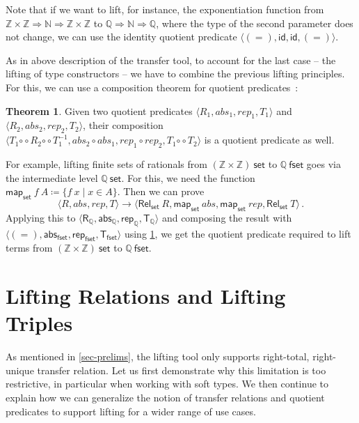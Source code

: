 \documentclass{article}
\theoremstyle{definition}
\newtheorem{theorem}[definition]{Theorem}
\newcommand{\relcomp}{\mathbin{\circ\circ}}
\newcommand{\inv}{^{-1}}
\newcommand{\bool}{\mathsf{Bool}}
\newcommand{\id}{\mathsf{id}}
\newcommand{\rel}{\mathsf{Rel}}
\newcommand{\nat}{\mathbb{N}}
\newcommand{\inte}{\mathbb{Z}}
\newcommand{\rat}{\mathbb{Q}}
\newcommand{\abs}{\mathsf{abs}}
\newcommand{\rep}{\mathsf{rep}}
\begin{document}
Note that if we want to lift, for instance,
the exponentiation function from \(\inte \times \inte \Rightarrow \nat \Rightarrow \inte \times \inte\) to \(\rat \Rightarrow \nat \Rightarrow \rat\),
where the type of the second parameter does not change,
we can use the identity quotient predicate \(\langle (=), \id, \id, (=) \rangle\).

As in above description of the transfer tool,
to account for the last case -- the lifting of type constructors --
we have to combine the previous lifting principles.
For this, we can use a composition theorem for quotient predicates~\cite{huffman2013lifting}:
\begin{theorem}\label{eq:quotient-comp}
	Given two quotient predicates \(\langle R_1, abs_1, rep_1, T_1 \rangle\) and \(\langle R_2, abs_2, rep_2, T_2 \rangle\), their composition \(\langle T_1 \relcomp R_2 \relcomp T_1\inv, abs_2 \circ abs_1, rep_1 \circ rep_2, T_1 \relcomp T_2 \rangle\) is a quotient predicate as well.
\end{theorem}
For example, lifting finite sets of rationals from \((\inte \times \inte)\ \mathsf{set}\) to \(\rat\ \mathsf{fset}\)
goes via the intermediate level \(\rat\ \mathsf{set}\). For this, we need the function \(\mathsf{map_{set}}\ f\ A \coloneqq \{f\ x \mid x \in A\}\).
Then we can prove
\begin{equation}
	\langle R, abs, rep, T\rangle \longrightarrow \langle \rel_\mathsf{set}\ R, \mathsf{map_{set}}\ abs, \mathsf{map_{set}}\ rep, \rel_\mathsf{set}\ T \rangle\label{eq:set-rel}\,.
\end{equation}
Applying this to \(\langle \mathsf{R_\rat}, \abs_\rat, \rep_\rat, \mathsf{T_\rat} \rangle\) and composing the result with \(\langle (=), \abs_\mathsf{fset}, \rep_\mathsf{fset}, \mathsf{T_{fset}} \rangle\) using \cref{eq:quotient-comp}, we get the quotient predicate required to lift terms from \((\inte \times \inte)\ \mathsf{set}\) to \(\rat\ \mathsf{fset}\).

\section{Lifting Relations and Lifting Triples}\label{lift-trip-sec}
As mentioned in \cref{sec-prelims},
the lifting tool only supports right-total, right-unique transfer relation.
Let us first demonstrate why this limitation is too restrictive,
in particular when working with soft types.
We then continue to explain how we can generalize the notion of transfer relations
and quotient predicates to support lifting for a wider range of use cases.
\end{document}
